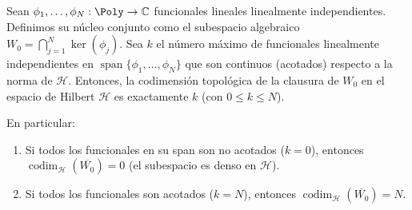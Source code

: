 \begin{thm}\label{thm:dicotomia_N_general}
	Sean $\phi_1, \dots, \phi_N : \Poly \to \mathbb{C}$ funcionales lineales linealmente independientes. Definimos su núcleo conjunto como el subespacio algebraico $W_0 = \bigcap_{j=1}^N \ker(\phi_j)$.
	Sea $k$ el número máximo de funcionales linealmente independientes en $\operatorname{span}\{\phi_1, \dots, \phi_N\}$ que son continuos (acotados) respecto a la norma de $\mathcal{H}$.
	Entonces, la codimensión topológica de la clausura de $W_0$ en el espacio de Hilbert $\mathcal{H}$ es exactamente $k$ (con $0 \le k \le N$).

	En particular:
	\begin{enumerate}
		\item Si todos los funcionales en su span son no acotados ($k=0$), entonces $\operatorname{codim}_\mathcal{H}(\overline{W_0}) = 0$ (el subespacio es denso en $\mathcal{H}$).
		\item Si todos los funcionales son acotados ($k=N$), entonces $\operatorname{codim}_\mathcal{H}(\overline{W_0}) = N$.
	\end{enumerate}
\end{thm}

